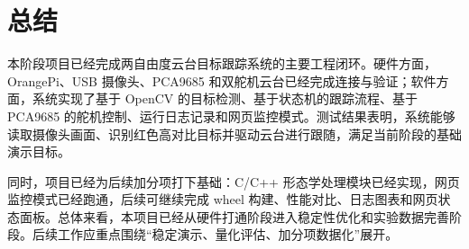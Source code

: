 \chapter{总结}

本阶段项目已经完成两自由度云台目标跟踪系统的主要工程闭环。硬件方面，OrangePi、USB 摄像头、PCA9685 和双舵机云台已经完成连接与验证；软件方面，系统实现了基于 OpenCV 的目标检测、基于状态机的跟踪流程、基于 PCA9685 的舵机控制、运行日志记录和网页监控模式。测试结果表明，系统能够读取摄像头画面、识别红色高对比目标并驱动云台进行跟随，满足当前阶段的基础演示目标。

同时，项目已经为后续加分项打下基础：C/C++ 形态学处理模块已经实现，网页监控模式已经跑通，后续可继续完成 wheel 构建、性能对比、日志图表和网页状态面板。总体来看，本项目已经从硬件打通阶段进入稳定性优化和实验数据完善阶段。后续工作应重点围绕“稳定演示、量化评估、加分项数据化”展开。

